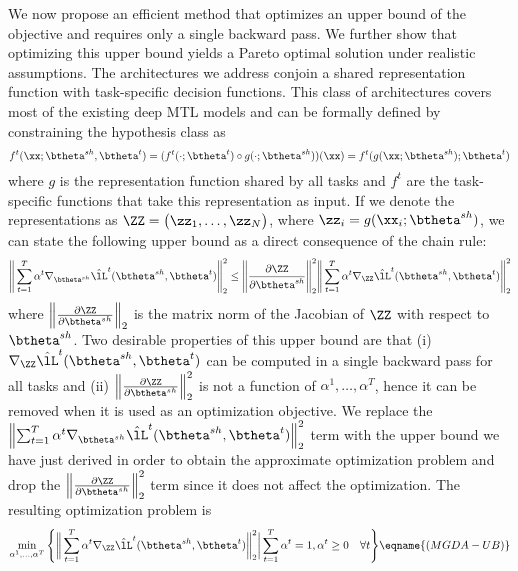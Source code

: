 We now propose an efficient method that optimizes an upper bound of the objective and requires only a single backward pass. We further show that optimizing this upper bound yields a Pareto optimal solution under realistic assumptions. The architectures we address conjoin a shared representation function with task-specific decision functions. This class of architectures covers most of the existing deep MTL models and can be formally defined by constraining the hypothesis class as
\begin{equation}
f^t(\xx;\btheta^{sh},\btheta^t) = (f^t(\cdot; \btheta^t) \circ g(\cdot; \btheta^{sh})) (\xx)  = f^t( g(\xx; \btheta^{sh}); \btheta^t  )
\end{equation}
where $g$ is the representation function shared by all tasks and $f^t$ are the task-specific functions that take this representation as input. If we denote the representations as \mbox{$\ZZ = \big(\zz_1,\ldots,\zz_N \big)$}, where $\zz_i = g(\xx_i;\btheta^{sh})$, we can state the following upper bound as a direct consequence of the chain rule:
\begin{equation}
  \Bigg\| \sum_{t=1}^T \alpha^t \nabla_{\btheta^{sh}}  \hat{\lL}^t(\btheta^{sh},\btheta^t) \Bigg\|_2^2  \leq    \Bigg\|\frac{\partial \ZZ}{\partial \btheta^{sh}}\Bigg\|_2^2 \Bigg\| \sum_{t=1}^T \alpha^t  \nabla_{\ZZ}  \hat{\lL}^t(\btheta^{sh},\btheta^t) \Bigg\|_2^2
  \end{equation}
where  $\left\|\frac{\partial \ZZ}{\partial \btheta^{sh}}\right\|_2$ is the matrix norm of the Jacobian of $\ZZ$ with respect to $\btheta^{sh}$. Two desirable properties of this upper bound are that (i) $\nabla_{\ZZ} \hat{\lL}^t(\btheta^{sh},\btheta^t)$ can be computed in a single backward pass for all tasks and (ii) $\left\|\frac{\partial \ZZ}{\partial \btheta^{sh}}\right\|_2^2 $ is not a function of $\alpha^1,\ldots ,\alpha^T$, hence it can be removed when it is used as an optimization objective. We replace the $\left\| \sum_{t=1}^T \alpha^t \nabla_{\btheta^{sh}}  \hat{\lL}^t(\btheta^{sh},\btheta^t) \right\|_2^2$ term with the upper bound we have just derived in order to obtain the approximate optimization problem and drop the $\left\|\frac{\partial \ZZ}{\partial \btheta^{sh}}\right\|_2^2 $ term since it does not affect the optimization. The resulting optimization problem is
\begin{equation}
\min_{\alpha^1,\ldots,\alpha^T}  \Bigg\{  \bigg\| \sum_{t=1}^T \alpha^t  \nabla_{\ZZ}  \hat{\lL}^t(\btheta^{sh},\btheta^t) \bigg\|_2^2 \bigg |  \sum_{t=1}^T \alpha^t = 1, \alpha^t \geq 0 \quad \forall t \Bigg\} \\
\eqname{(MGDA-UB)}
\label{eq:approx}
\end{equation}

